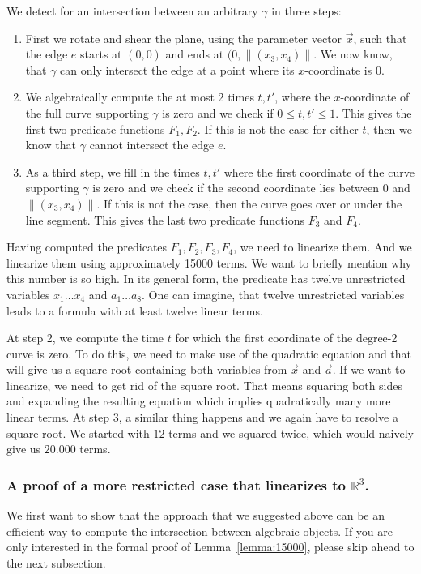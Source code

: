 \documentclass[UKenglish]{lipics-v2019}
\begin{document}
We detect for an intersection between an arbitrary $\gamma$ in three steps:
\begin{enumerate}
    \item First we rotate and shear the plane, using the parameter vector $\vec{x}$, such that the edge $e$ starts at $(0,0)$ and ends at $(0, \lVert (x_3, x_4) \rVert$. We now know, that $\gamma$ can only intersect the edge at a point where its $x$-coordinate is $0$. 
    \item We algebraically compute the at most 2 times $t, t'$, where the $x$-coordinate of the full curve supporting $\gamma$ is zero and we check if $0 \le t, t' \le 1$. This gives the first two predicate functions $F_1, F_2$. If this is not the case for either $t$, then we know that $\gamma$ cannot intersect the edge $e$.
    \item As a third step, we fill in the times $t, t'$ where the first coordinate of the curve supporting $\gamma$ is zero and we check if the second coordinate lies between $0$ and $ \lVert (x_3, x_4) \rVert$. If this is not the case, then the curve goes over or under the line segment. This gives the last two predicate functions $F_3$ and $F_4$.
\end{enumerate}

Having computed the predicates $F_1, F_2, F_3, F_4$, we need to linearize them. And we linearize them using approximately 15000 terms. We want to briefly mention why this number is so high. In its general form, the predicate has twelve unrestricted variables $x_1 \ldots x_4$ and $a_1 \ldots a_8$. One can imagine, that twelve unrestricted variables leads to a formula with at least twelve linear terms.

At step 2, we compute the time $t$ for which the first coordinate of the degree-2 curve is zero. To do this, we need to make use of the quadratic equation and that will give us a square root containing both variables from $\vec{x}$ and $\vec{a}$. If we want to linearize, we need to get rid of the square root. That means squaring both sides and expanding the resulting equation which implies quadratically many more linear terms. At step 3, a similar thing happens and we again have to resolve a square root. We started with $12$ terms and we squared twice, which would naively give us $20.000$ terms.



\subsubsection{A proof of a more restricted case that linearizes to $\mathbb{R}^3$.}
We first want to show that the approach that we suggested above can be an efficient way to compute the intersection between algebraic objects. If you are only interested in the formal proof of Lemma~\ref{lemma:15000}, please skip ahead to the next subsection.
\end{document}
